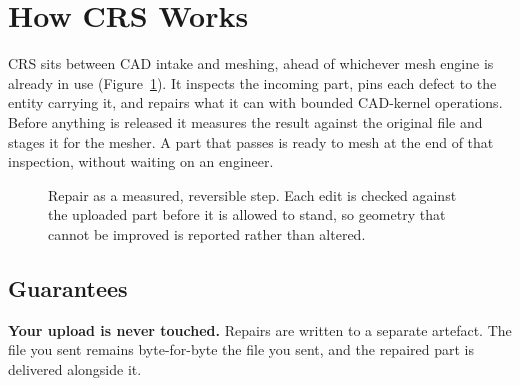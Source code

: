 \documentclass[10pt,onecolumn]{article}
\newcommand{\topic}[1]{\textbf{#1.}\hspace{0.5em}\ignorespaces}
\begin{document}
\section{How CRS Works}\label{sec:how}

CRS sits between CAD intake and meshing, ahead of whichever mesh engine is already in use
(Figure~\ref{fig:pipeline}). It inspects the incoming part, pins each defect to the entity
carrying it, and repairs what it can with bounded CAD-kernel operations. Before anything is
released it measures the result against the original file and stages it for the mesher. A part
that passes is ready to mesh at the end of that inspection, without waiting on an engineer.

\begin{figure}[h]
\centering
{}
\caption{Repair as a measured, reversible step. Each edit is checked against the uploaded part
before it is allowed to stand, so geometry that cannot be improved is reported rather than
altered.}
\label{fig:pipeline}
\end{figure}

\subsection{Guarantees}

\topic{Your upload is never touched} Repairs are written to a separate artefact. The file you sent
remains byte-for-byte the file you sent, and the repaired part is delivered alongside it.
\end{document}
